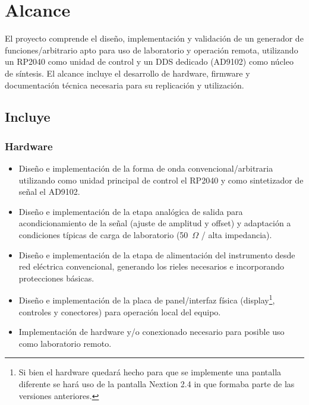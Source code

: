 \section{Alcance}
El proyecto comprende el diseño, implementación y validación de un generador de funciones/arbitrario apto para uso de laboratorio y operación remota, utilizando un RP2040 como unidad de control y un DDS dedicado (AD9102) como núcleo de síntesis. El alcance incluye el desarrollo de hardware, firmware y documentación técnica necesaria para su replicación y utilización.

\subsection{Incluye}

\subsubsection{Hardware}
\begin{itemize}
	\item Diseño e implementación de la forma de onda convencional/arbitraria utilizando como unidad principal de control el RP2040 y como sintetizador de señal el AD9102.
	\item Diseño e implementación de la etapa analógica de salida para acondicionamiento de la señal (ajuste de amplitud y offset) y adaptación a condiciones típicas de carga de laboratorio (50~\(\Omega\) / alta impedancia).
	\item Diseño e implementación de la etapa de alimentación del instrumento desde red eléctrica convencional, generando los rieles necesarios e incorporando protecciones básicas.
	\item Diseño e implementación de la placa de panel/interfaz física (display\footnote{Si bien el hardware quedará hecho para que se implemente una pantalla diferente se hará uso de la pantalla Nextion 2.4 in que formaba parte de las versiones anteriores.}, controles y conectores) para operación local del equipo.
	\item Implementación de hardware y/o conexionado necesario para posible uso como laboratorio remoto.
\end{itemize}

